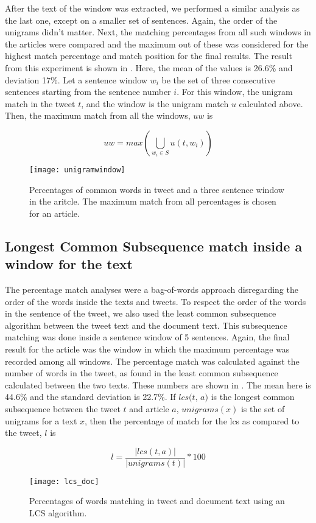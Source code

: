 After the text of the window was extracted, we performed a similar analysis as the last one, except on a smaller set of sentences. Again, the order of the unigrams didn't matter. Next, the matching percentages from all such windows in the articles were compared and the maximum out of these was considered for the highest match percentage and match position for the final results. The result from this experiment is shown in . Here, the mean of the values is 26.6\% and deviation 17\%. Let a sentence window $w_i$ be the set of three consecutive sentences starting from the sentence number $i$. For this window, the unigram match in the tweet $t$, and the window is the unigram match $u$ calculated above. Then, the maximum match from all the windows, $uw$ is 

\begin{equation}
uw = max \left( \bigcup_{w_i \in S} u \left( t, w_i \right) \right)
\end{equation}

\begin{figure}[htbp]
\centering
\texttt{[image: unigramwindow]}
\caption{Percentages of common words in tweet and a three sentence window in the aritcle. The maximum match from all percentages is chosen for an article.}
\label{fig:unigramwindow}
\end{figure}

\subsection{Longest Common Subsequence match inside a window for the text}

The percentage match analyses were a bag-of-words approach disregarding the order of the words inside the texts and tweets. To respect the order of the words in the sentence of the tweet, we also used the least common subsequence algorithm between the tweet text and the document text. This subsequence matching was done inside a sentence window of 5 sentences. Again, the final result for the article was the window in which the maximum percentage was recorded among all windows. The percentage match was calculated against the number of words in the tweet, as found in the least common subsequence calculated between the two texts. These numbers are shown in . The mean here is 44.6\% and the standard deviation is 22.7\%. If $\textit{lcs(t, a)}$ is the longest common subsequence between the tweet $t$ and article $a$, $\textit{unigrams}(x)$ is the set of unigrams for a text $x$, then the percentage of match for the lcs as compared to the tweet, $\textit{l}$ is

\begin{equation}
l = \frac{| lcs(t, a) |}{| unigrams(t) |} * 100
\end{equation}

\begin{figure}[htbp]
\centering
\texttt{[image: lcs\_doc]}
\caption{Percentages of words matching in tweet and document text using an LCS algorithm.}
\label{fig:lcs}
\end{figure}



